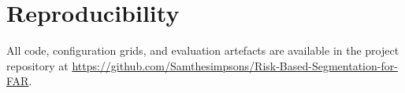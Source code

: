 \section{Reproducibility}
\label{sec:reproducibility}

All code, configuration grids, and evaluation artefacts are available in the project repository at \url{https://github.com/Samthesimpsons/Risk-Based-Segmentation-for-FAR}.
